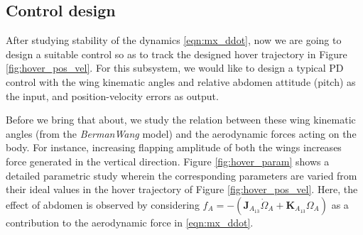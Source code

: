 \documentclass[10pt]{article}
\begin{document}
\subsection{Control design}
After studying stability of the dynamics \eqref{eqn:mx_ddot}, now we are going to design a suitable control so as to track the designed hover trajectory in Figure \ref{fig:hover_pos_vel}. For this subsystem, we would like to design a typical PD control with the wing kinematic angles and relative abdomen attitude (pitch) as the input, and position-velocity errors as output.

Before we bring that about, we study the relation between these wing kinematic angles (from the \textit{BermanWang} model) and the aerodynamic forces acting on the body. For instance, increasing flapping amplitude of both the wings increases force generated in the vertical direction. Figure \ref{fig:hover_param} shows a detailed parametric study wherein the corresponding parameters are varied from their ideal values in the hover trajectory of Figure \ref{fig:hover_pos_vel}. Here, the effect of abdomen is observed by considering $ f_A = -(\mathbf{J}_{A_{13}} \dot\Omega_A + \mathbf{K}_{A_{13}} \Omega_A) $ as a contribution to the aerodynamic force in \eqref{eqn:mx_ddot}.

\end{document}
